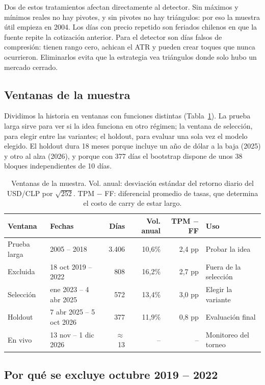 \documentclass[10pt,a4paper]{article}
\begin{document}
Dos de estos tratamientos afectan directamente al detector. Sin máximos y mínimos
reales no hay pivotes, y sin pivotes no hay triángulos: por eso la muestra útil
empieza en 2004. Los días con precio repetido son feriados chilenos en que la
fuente repite la cotización anterior. Para el detector son días falsos de
compresión: tienen rango cero, achican el ATR y pueden crear toques que nunca
ocurrieron. Eliminarlos evita que la estrategia vea triángulos donde solo hubo un
mercado cerrado.

\subsection{Ventanas de la muestra}\label{sec:ventanas}

Dividimos la historia en ventanas con funciones distintas (Tabla~\ref{tab:ventanas}).
La prueba larga sirve para ver si la idea funciona en otro régimen; la ventana de
selección, para elegir entre las variantes; el holdout, para evaluar una sola vez
el modelo elegido. El holdout dura 18 meses porque incluye un año de dólar a la
baja (2025) y otro al alza (2026), y porque con 377 días el bootstrap dispone de
unos 38 bloques independientes de 10 días.

\begin{table}[htbp]\centering\small
\begin{tabular}{@{}llrrrl@{}}
\toprule
Ventana & Fechas & Días & Vol. anual & TPM $-$ FF & Uso \\
\midrule
Prueba larga  & 2005 -- 2018             & 3.406 & 10,6\% & 2,4 pp & Probar la idea \\
Excluida      & 18 oct 2019 -- 2022      & 808   & 16,2\% & 2,7 pp & Fuera de la selección \\
Selección     & ene 2023 -- 4 abr 2025   & 572   & 13,4\% & 3,0 pp & Elegir la variante \\
Holdout       & 7 abr 2025 -- 5 oct 2026 & 377   & 11,9\% & 0,8 pp & Evaluación final \\
En vivo       & 13 nov -- 1 dic 2026     & $\approx$13 & -- & -- & Monitoreo del torneo \\
\bottomrule
\end{tabular}
\caption{Ventanas de la muestra. Vol. anual: desviación estándar del retorno diario
del USD/CLP por $\sqrt{252}$. TPM $-$ FF: diferencial promedio de tasas, que
determina el costo de carry de estar largo.}\label{tab:ventanas}
\end{table}

\subsection{Por qué se excluye octubre 2019 -- 2022}\label{sec:exclusion}
\end{document}
